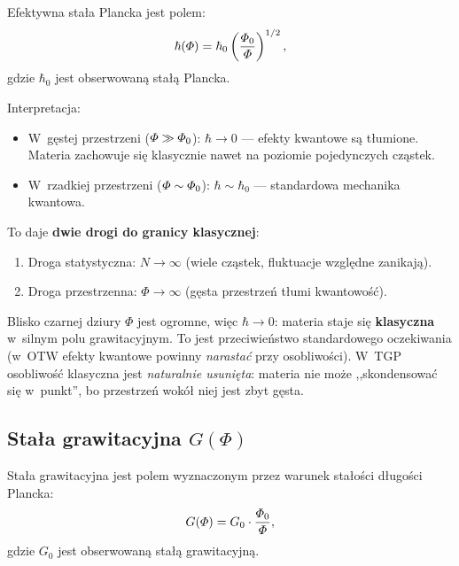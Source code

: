 \begin{axiom}\label{ax:hbar}
Efektywna sta\l{}a Plancka jest polem:
\begin{equation}\label{eq:hbarPhi}
    \hbar(\varPhi) = \hbar_0 \left(\frac{\varPhi_0}{\varPhi}\right)^{1/2},
\end{equation}
gdzie $\hbar_0$ jest obserwowaną sta\l{}\k{a} Plancka.
\end{axiom}

Interpretacja:
\begin{itemize}[nosep]
  \item W~g\k{e}stej przestrzeni ($\varPhi \gg \varPhi_0$):
        $\hbar \to 0$ --- efekty kwantowe s\k{a} t\l{}umione.
        Materia zachowuje si\k{e} klasycznie nawet na poziomie
        pojedynczych cz\k{a}stek.
  \item W~rzadkiej przestrzeni ($\varPhi \sim \varPhi_0$):
        $\hbar \sim \hbar_0$ --- standardowa mechanika kwantowa.
\end{itemize}

To daje \textbf{dwie drogi do granicy klasycznej}:
\begin{enumerate}[nosep]
  \item Droga statystyczna: $N \to \infty$ (wiele cz\k{a}stek,
        fluktuacje wzgl\k{e}dne zanikaj\k{a}).
  \item Droga przestrzenna: $\Phi \to \infty$ (g\k{e}sta
        przestrze\'n t\l{}umi kwantowo\'s\'c).
\end{enumerate}

\begin{remark}
Blisko czarnej dziury $\Phi$ jest ogromne, wi\k{e}c $\hbar \to 0$:
materia staje si\k{e} \textbf{klasyczna} w~silnym polu grawitacyjnym.
To jest przeciwie\'nstwo standardowego oczekiwania (w~OTW
efekty kwantowe powinny \emph{narastać} przy osobliwo\'sci).
W~TGP osobliwo\'s\'c klasyczna jest \emph{naturalnie usuni\k{e}ta}:
materia nie mo\.ze ,,skondensowa\'c si\k{e} w~punkt'', bo przestrze\'n
wok\'o\l{} niej jest zbyt g\k{e}sta.
\end{remark}

\subsection{Sta\l{}a grawitacyjna $G(\Phi)$}\label{ssec:G}

\begin{axiom}\label{ax:G}
Sta\l{}a grawitacyjna jest polem wyznaczonym przez warunek
sta\l{}o\'sci d\l{}ugo\'sci Plancka:
\begin{equation}\label{eq:GPhi}
    G(\varPhi) = G_0 \cdot \frac{\varPhi_0}{\varPhi},
\end{equation}
gdzie $G_0$ jest obserwowaną sta\l{}\k{a} grawitacyjn\k{a}.
\end{axiom}

